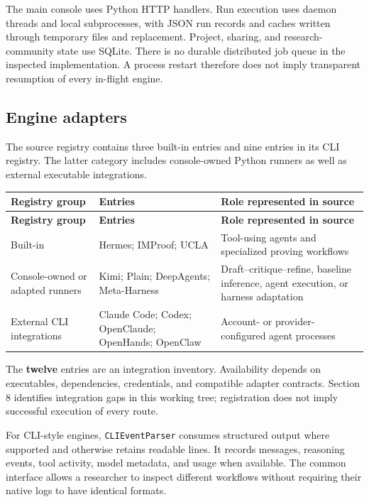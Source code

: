 \documentclass[10pt,letterpaper]{article}
\begin{document}
The main console uses Python HTTP handlers. Run execution uses daemon threads and local subprocesses, with JSON run records and caches written through temporary files and replacement. Project, sharing, and research-community state use SQLite. There is no durable distributed job queue in the inspected implementation. A process restart therefore does not imply transparent resumption of every in-flight engine.

\subsection{Engine adapters}

The source registry contains three built-in entries and nine entries in its CLI registry. The latter category includes console-owned Python runners as well as external executable integrations.

\begingroup\small
\setlength{\tabcolsep}{4pt}
\begin{longtable}{>{\raggedright\arraybackslash}p{0.23\dimexpr\linewidth-6\tabcolsep\relax}>{\raggedright\arraybackslash}p{0.38\dimexpr\linewidth-6\tabcolsep\relax}>{\raggedright\arraybackslash}p{0.39\dimexpr\linewidth-6\tabcolsep\relax}}
\toprule
\textbf{Registry group} & \textbf{Entries} & \textbf{Role represented in source} \\
\midrule\endfirsthead
\toprule
\textbf{Registry group} & \textbf{Entries} & \textbf{Role represented in source} \\
\midrule\endhead
\bottomrule\endfoot
Built-in & Hermes; IMProof; UCLA & Tool-using agents and specialized proving workflows \\
Console-owned or adapted runners & Kimi; Plain; DeepAgents; Meta-Harness & Draft--critique--refine, baseline inference, agent execution, or harness adaptation \\
External CLI integrations & Claude Code; Codex; OpenClaude; OpenHands; OpenClaw & Account- or provider-configured agent processes \\
\end{longtable}
\endgroup

The \textbf{twelve} entries are an integration inventory. Availability depends on executables, dependencies, credentials, and compatible adapter contracts. Section 8 identifies integration gaps in this working tree; registration does not imply successful execution of every route.

For CLI-style engines, \nolinkurl{CLIEventParser} consumes structured output where supported and otherwise retains readable lines. It records messages, reasoning events, tool activity, model metadata, and usage when available. The common interface allows a researcher to inspect different workflows without requiring their native logs to have identical formats.
\end{document}
